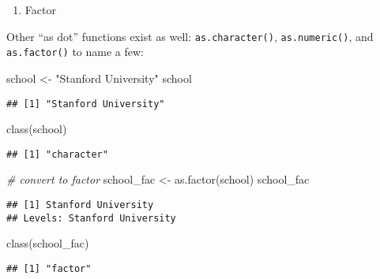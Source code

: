 \documentclass[
]{article}
\newenvironment{Shaded}{\begin{snugshade}}{\end{snugshade}}
\newcommand{\CommentTok}[1]{\textcolor[rgb]{0.56,0.35,0.01}{\textit{#1}}}
\newcommand{\FunctionTok}[1]{\textcolor[rgb]{0.00,0.00,0.00}{#1}}
\newcommand{\NormalTok}[1]{#1}
\newcommand{\OtherTok}[1]{\textcolor[rgb]{0.56,0.35,0.01}{#1}}
\newcommand{\StringTok}[1]{\textcolor[rgb]{0.31,0.60,0.02}{#1}}
\providecommand{\tightlist}{%
  \setlength{\itemsep}{0pt}\setlength{\parskip}{0pt}}
\begin{document}
\begin{enumerate}
\def\labelenumi{\arabic{enumi}.}
\setcounter{enumi}{4}
\tightlist
\item
  Factor
\end{enumerate}

Other ``as dot'' functions exist as well: \texttt{as.character()},
\texttt{as.numeric()}, and \texttt{as.factor()} to name a few:

\begin{Shaded}
\begin{Highlighting}[]
\NormalTok{school }\OtherTok{\textless{}{-}} \StringTok{"Stanford University"}
\NormalTok{school}
\end{Highlighting}
\end{Shaded}

\begin{verbatim}
## [1] "Stanford University"
\end{verbatim}

\begin{Shaded}
\begin{Highlighting}[]
\FunctionTok{class}\NormalTok{(school)}
\end{Highlighting}
\end{Shaded}

\begin{verbatim}
## [1] "character"
\end{verbatim}

\begin{Shaded}
\begin{Highlighting}[]
\CommentTok{\# convert to factor}
\NormalTok{school\_fac }\OtherTok{\textless{}{-}} \FunctionTok{as.factor}\NormalTok{(school)}
\NormalTok{school\_fac}
\end{Highlighting}
\end{Shaded}

\begin{verbatim}
## [1] Stanford University
## Levels: Stanford University
\end{verbatim}

\begin{Shaded}
\begin{Highlighting}[]
\FunctionTok{class}\NormalTok{(school\_fac)}
\end{Highlighting}
\end{Shaded}

\begin{verbatim}
## [1] "factor"
\end{verbatim}
\end{document}
